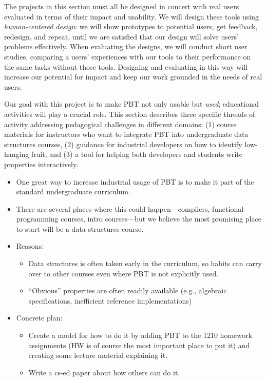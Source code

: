 
\bigskip
{}
The projects in this section must all be designed in concert with real users
evaluated in terms of their impact and usability. We will design these tools
using {\em human-centered design}: we will show prototypes to potential users,
get feedback, redesign, and repeat, until we are satisfied that our design will
solve users' problems effectively. When evaluating the designs, we will conduct
short user studies, comparing a users' experiences with our tools to their
performance on the same tasks without those tools. Designing and evaluating in
this way will increase our potential for impact and keep our work grounded in
the needs of real users.


Our goal with this project is to make PBT not only usable but {\em
  used}; educational activities will play a crucial role.  This
section describes three specific threads of activity addressing pedagogical
challenges in different domains:
(1) course materials for instructors who want to integrate PBT into
undergraduate data structures courses,
%
(2) guidance for
industrial developers on how to identify low-hanging fruit, and
%
(3) a
tool for helping both developers and students write properties
interactively.



\begin{itemize}
\item One great way to increase industrial usage of PBT is to make it
part of the standard undergraduate curriculum.
\item There are several places where this could happen---compilers,
functional programming courses, intro courses---but we believe the
most promising place to start will be a data structures course.
\item Reasons:
  \begin{itemize}
  \item Data structures is often taken early in the curriculum, so
  habits can carry over to other courses even where PBT is not
  explicitly used.
  \item ``Obvious'' properties are often readily available (e.g.,
  algebraic specifications, inefficient reference implementations)
  \end{itemize}
\item Concrete plan:
\begin{itemize}
\item Create a model for how to do it by adding PBT to
the 1210 homework assignments (HW is of course the most important
place to put it) and creating some lecture material explaining it.
\item Write a cs-ed paper about how others can do it.
\end{itemize}
\end{itemize}

